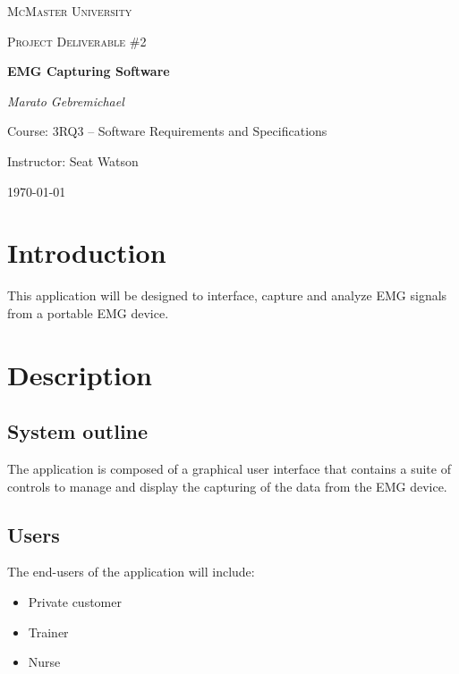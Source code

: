 \documentclass[12pt,a4paper]{article}
\begin{document}
\begin{titlepage}
	\centering
	{\scshape\LARGE McMaster University \par}
	\vspace{2cm}
	{\scshape\Large Project Deliverable \#2 \par}
	\vspace{4cm}
	{\huge\bfseries EMG Capturing Software\par}
	\vspace{2cm}
	{\Large\itshape Marato Gebremichael\par}
	
	\vfill
	Course: 3RQ3 – Software Requirements and Specifications\par
    Instructor: Seat Watson

	\vfill

	{\large \today\par}
\end{titlepage}

\tableofcontents

\newpage

\section{Introduction}

This application will be designed to interface, capture and analyze EMG signals from a portable EMG device.  

\section{Description}

\subsection{System outline}

The application is composed of a graphical user interface that contains a suite of controls to manage and display the capturing of the data from the EMG device.

\subsection{Users}

The end-users of the application will include:

\begin{itemize}
	\item Private customer
	\item Trainer
	\item Nurse
\end{itemize}
\end{document}
